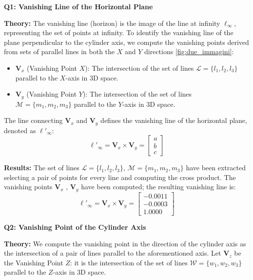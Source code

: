 \documentclass[a4paper,11pt]{article}
\newcommand{\vect}[1]{\mathbf{#1}}  %
\newcommand{\lineinf}{\ell_\infty}  %
\begin{document}
\noindent \textbf{Q1: Vanishing Line of the Horizontal Plane} 

\textbf{Theory:} The vanishing line (horizon) is the image of the line at infinity $\lineinf$, representing the set of points at infinity. To identify the vanishing line of the plane perpendicular to the cylinder axis, we compute the vanishing points derived from sets of parallel lines in both the $X$ and $Y$ directions \ref{fig:due_immagini}:

\begin{itemize}
    \item $\vect{V}_x$ (Vanishing Point $X$): The intersection of the set of lines $\mathcal{L} = \{l_1, l_2, l_3\}$ parallel to the $X$-axis in 3D space.
    \item $\vect{V}_y$ (Vanishing Point $Y$): The intersection of the set of lines $\mathcal{M} = \{m_1, m_2, m_3\}$ parallel to the $Y$-axis in 3D space.
\end{itemize}

The line connecting $\vect{V}_x$ and $\vect{V}_y$ defines the vanishing line of the horizontal plane, denoted as $\ell'_\infty$:
\begin{equation}
    \ell'_\infty = \vect{V}_x \times \vect{V}_y = 
    \begin{bmatrix}
    a \\
    b \\
    c
    \end{bmatrix}
\end{equation}

\textbf{Results:} The set of lines $\mathcal{L} = \{l_1, l_2, l_3\}$, $\mathcal{M} = \{m_1, m_2, m_3\}$ have been extracted selecting a pair of points for every line and computing the cross product. The vanishing points $\vect{V}_x$ , $\vect{V}_y$ have been computed; the resulting vanishing line is:
\begin{equation}
    \ell'_\infty = \vect{V}_x \times \vect{V}_y = 
    \begin{bmatrix}
        -0.0011 \\
        -0.0003 \\
        1.0000 
    \end{bmatrix}
\end{equation}

\noindent \textbf{Q2: Vanishing Point of the Cylinder Axis}

\textbf{Theory:} We compute the vanishing point in the direction of the cylinder axis as the intersection of a pair of lines parallel to the aforementioned axis. Let $\vect{V}_z$ be the Vanishing Point $Z$: it is the intersection of the set of lines $\mathcal{W} = \{w_1, w_2, w_3\}$ parallel to the $Z$-axis in 3D space.
\end{document}

